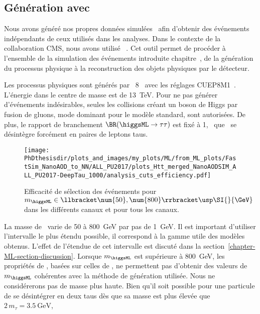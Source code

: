 \subsection{Génération avec \FASTSIM}\label{chapter-ML-section-evt_gen-FASTSIM}
Nous avons généré nos propres données simulées~\cite{fastsim_ece}
afin d'obtenir des événements indépendants de ceux utilisés dans les analyses.
Dans le contexte de la collaboration CMS, nous avons utilisé \FASTSIM~\cite{FastSim_2011,FastSim_2014,FastSim_2017_1,FastSim_2017_2}.
Cet outil permet de procéder à l'ensemble de la simulation des événements introduite chapitre~,
de la génération du processus physique à la reconstruction des objets physiques par le détecteur.
\par
Les processus physiques sont générés par
\PYTHIA~8~\cite{pythia8.2}
avec les réglages CUEP8M1~\cite{tunes_2016,tunes_2019}.
L'énergie dans le centre de masse est de \SI{13}{\TeV}.
Pour ne pas générer d'événements indésirables,
seules les collisions créant un boson de Higgs par fusion de gluons, mode dominant pour le modèle standard, sont autorisées.
De plus, le rapport de branchement $\BR(\higgsML\to\tau\tau)$ est fixé à 1,
\ie\ que \higgsML\ se désintègre forcément en paires de leptons taus.
\begin{wrapfigure}{R}{.45\textwidth}
\centering
\texttt{[image: \\PhDthesisdir/plots\_and\_images/my\_plots/ML/from\_ML\_plots/FastSim\_NanoAOD\_to\_NN/ALL\_PU2017/plots\_Htt\_merged\_NanoAODSIM\_ALL\_PU2017-DeepTau\_1000/analysis\_cuts\_efficiency.pdf]}
\caption[Efficacité de sélection des événements.]{Efficacité de sélection des événements pour $m_{\higgsML}\in\llbracket \num{50} , \num{800} \rrbracket \usp \SI{}{\GeV}$ dans les différents canaux et pour tous les canaux.}
\label{fig-analysis_cuts_efficiency}
\end{wrapfigure}
\par
La masse de \higgsML\ varie de \num{50} à \SI{800}{\GeV} par pas de \SI{1}{\GeV}.
Il est important d'utiliser l'intervalle le plus étendu possible, il correspond à la gamme utile des modèles obtenus.
L'effet de l'étendue de cet intervalle est discuté dans la section~\ref{chapter-ML-section-discussion}.
Lorsque $m_{\higgsML}$ est supérieure à \SI{800}{\GeV}, les propriétés de \higgsML, basées sur celles de \higgs, ne permettent pas d'obtenir des valeurs de $m_{\higgsML}$ cohérentes avec la méthode de génération utilisée.
Nous ne considérerons pas de masse plus haute.
Bien qu'il soit possible pour une particule de se désintégrer en deux taus dès que sa masse est plus élevée que $2\,m_{\tau} = \SI{3.5}{\GeV}$,
